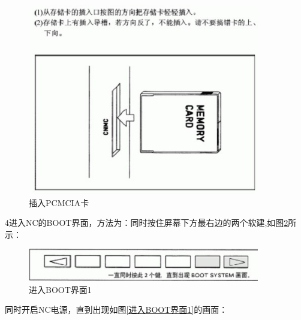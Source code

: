 \begin{figure}[!hbtp]
	\centering	\includegraphics[width=0.9\textwidth]{images/14-2}
	\caption{插入PCMCIA卡} \label{插入PCMCIA卡}
\end{figure}

4进入NC的BOOT界面，方法为：同时按住屏幕下方最右边的两个软建,如图\ref{进入BOOT界面}所示：

\begin{figure}[!hbtp]
\centering	\includegraphics[width=0.9\textwidth]{images/14-3}
\caption{进入BOOT界面1} \label{进入BOOT界面}
\end{figure}

同时开启NC电源，直到出现如图\ref{进入BOOT界面1}的画面：

